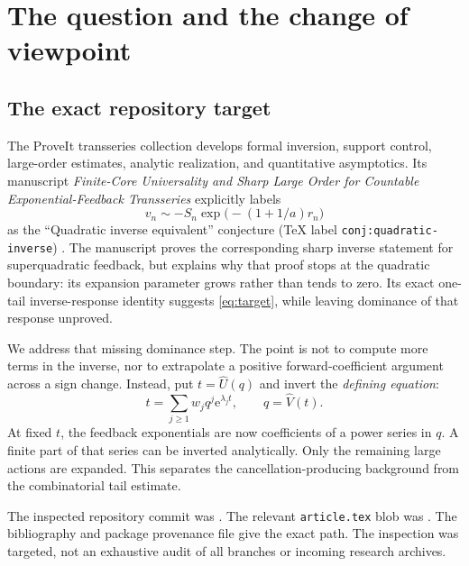 \documentclass[11pt,a4paper]{article}
\numberwithin{equation}{section}
\theoremstyle{definition}
\theoremstyle{remark}\newtheorem{remark}[theorem]{Remark}
\newcommand{\ee}{\mathrm e}\newcommand{\dd}{\mathrm d}
\newcommand{\U}{\widehat U}\newcommand{\V}{\widehat V}
\begin{document}
\clearpage
\setcounter{tocdepth}{1}\tableofcontents
\clearpage

\section{The question and the change of viewpoint}
\label{sec:context}

\subsection{The exact repository target}
The ProveIt transseries collection develops formal inversion, support control,
large-order estimates, analytic realization, and quantitative asymptotics.
Its manuscript \emph{Finite-Core Universality and Sharp Large Order for
Countable Exponential-Feedback Transseries} explicitly labels
\begin{equation}
 v_n\sim-S_n\exp\bigl(-(1+1/a)r_n\bigr)
 \label{eq:target}
\end{equation}
as the ``Quadratic inverse equivalent'' conjecture
(TeX label \texttt{conj:quadratic-inverse}) \cite{repo-core}.
The manuscript proves the corresponding sharp inverse statement for
superquadratic feedback, but explains why that proof stops at the quadratic
boundary: its expansion parameter grows rather than tends to zero.
Its exact one-tail inverse-response identity suggests \eqref{eq:target},
while leaving dominance of that response unproved.

We address that missing dominance step. The point is not to compute more
terms in the inverse, nor to extrapolate a positive forward-coefficient
argument across a sign change. Instead, put $t=\U(q)$ and invert the
\emph{defining equation}:
\begin{equation}
 t=\sum_{j\ge1}w_jq^j\ee^{\lambda_jt},\qquad q=\V(t).
 \label{eq:direct}
\end{equation}
At fixed $t$, the feedback exponentials are now coefficients of a power
series in $q$. A finite part of that series can be inverted analytically.
Only the remaining large actions are expanded. This separates the
cancellation-producing background from the combinatorial tail estimate.

The inspected repository commit was
.
The relevant \texttt{article.tex} blob was
.
The bibliography and package provenance file give the exact path. The
inspection was targeted, not an exhaustive audit of all branches or incoming
research archives.
\end{document}
